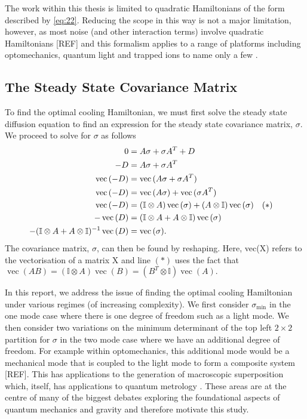 \documentclass[11pt,a4paper]{article}
\numberwithin{equation}{section}
\DeclareMathOperator{\Vect}{vec}
\begin{document}
	The work within this thesis is limited to quadratic Hamiltonians of the form described by \ref{eq:22}. Reducing the scope in this way is not a major limitation, however, as most noise (and other interaction terms) involve quadratic Hamiltonians [REF] and this formalism applies to a range of platforms including optomechanics, quantum light and trapped ions to name only a few \cite{Serafini17}. 
	
	\subsection{The Steady State Covariance Matrix}
	\label{sec:sigmasolve}
	
	To find the optimal cooling Hamiltonian, we must first solve the steady state diffusion equation to find an expression for the steady state covariance matrix, $\sigma$. We proceed to solve for $\sigma$ as follows
	\begin{align}\label{eq:40}
	0 &= A\sigma +\sigma A^{T} + D&\notag\\
	-D &= A\sigma +\sigma A^{T}&\notag\\
	\Vect{(-D)} &= \Vect{(A\sigma +\sigma A^{T})}&\notag\\
	\Vect{(-D)} &= \Vect{(A\sigma)} + \Vect{(\sigma A^{T})}&\notag\\
	\Vect{(-D)} &= (\mathbb{I} \otimes A)\Vect{(\sigma)} + (A \otimes \mathbb{I})\Vect{(\sigma)}\quad(*)\notag&\\
	-\Vect{(D)} &= (\mathbb{I} \otimes A + A \otimes \mathbb{I}) \Vect{(\sigma)}\notag&\\
	-(\mathbb{I} \otimes A + A \otimes \mathbb{I})^{-1}\Vect{(D)} &= \Vect{(\sigma)}.&
	\end{align}
	The covariance matrix, $\sigma$, can then be found by reshaping.
	Here, vec(X) refers to the vectorisation of a matrix X and line $(*)$ uses the fact that $\Vect{(AB)}=(\mathbb{I} \otimes A)\Vect{(B)}=(B^{T} \otimes \mathbb{I})\Vect{(A)}.$

	In this report, we address the issue of finding the optimal cooling Hamiltonian under various regimes (of increasing complexity). We first consider $\sigma_\text{min}$ in the one mode case where there is one degree of freedom such as a light mode. We then consider two variations on the minimum determinant of the top left $2 \times 2$ partition for $\sigma$ in the two mode case where we have an additional degree of freedom. For example within optomechanics, this additional mode would be a mechanical mode that is coupled to the light mode to form a composite system [REF]. This has applications to the generation of macroscopic superposition \cite{Hoff} which, itself, has applications to quantum metrology \cite{Giovannetti}. These areas are at the centre of many of the biggest debates exploring the foundational aspects of quantum mechanics and gravity \cite{Pikovski} and therefore motivate this study.	
	
\end{document}
